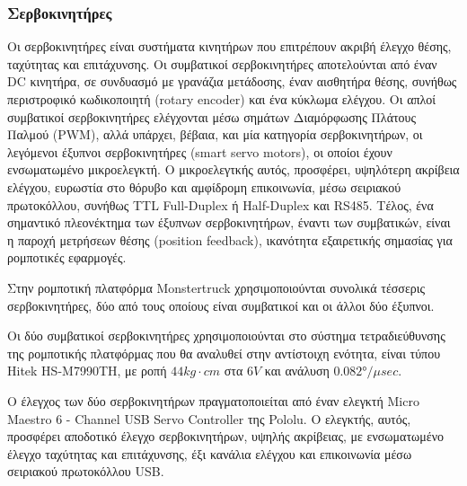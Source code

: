 \bigskip
\subsubsection{Σερβοκινητήρες} \label{sssec:servos}
Οι σερβοκινητήρες είναι συστήματα κινητήρων που επιτρέπουν ακριβή έλεγχο θέσης, ταχύτητας και επιτάχυνσης. Οι {συμβατικοί σερβοκινητήρες} αποτελούνται από έναν DC κινητήρα, σε συνδυασμό με {γρανάζια μετάδοσης}, έναν {αισθητήρα θέσης}, συνήθως {περιστροφικό κωδικοποιητή (rotary encoder)} και ένα κύκλωμα ελέγχου. Οι απλοί συμβατικοί σερβοκινητήρες ελέγχονται μέσω σημάτων Διαμόρφωσης Πλάτους Παλμού (PWM), αλλά υπάρχει, βέβαια, και μία κατηγορία σερβοκινητήρων, οι λεγόμενοι {έξυπνοι σερβοκινητήρες (smart servo motors)}, οι οποίοι έχουν ενσωματωμένο μικροελεγκτή. Ο μικροελεγτκής αυτός, προσφέρει, υψηλότερη ακρίβεια ελέγχου, ευρωστία στο θόρυβο και αμφίδρομη επικοινωνία, μέσω σειριακού πρωτοκόλλου, συνήθως {TTL Full-Duplex} ή {Half-Duplex} και {RS485}. Τέλος, ένα σημαντικό πλεονέκτημα των έξυπνων σερβοκινητήρων, έναντι των συμβατικών, είναι η παροχή μετρήσεων θέσης (position feedback), ικανότητα εξαιρετικής σημασίας για ρομποτικές εφαρμογές.

\bigskip
Στην ρομποτική πλατφόρμα {Monstertruck} χρησιμοποιούνται συνολικά τέσσερις σερβοκινητήρες, δύο από τους οποίους είναι {συμβατικοί} και οι άλλοι δύο {έξυπνοι}.

\bigskip
Οι δύο {συμβατικοί σερβοκινητήρες} χρησιμοποιούνται στο σύστημα {τετραδιεύθυνσης} της ρομποτικής πλατφόρμας που θα αναλυθεί στην αντίστοιχη ενότητα, είναι τύπου {Hitek HS-M7990TH}, με ροπή $44 kg \cdot cm $ στα $6V$ και ανάλυση $0.082°/\mu sec$.

\bigskip
Ο έλεγχος των δύο σερβοκινητήρων πραγματοποιείται από έναν ελεγκτή {Micro Maestro 6 - Channel USB Servo Controller} της {Pololu}. Ο ελεγκτής, αυτός, προσφέρει αποδοτικό έλεγχο σερβοκινητήρων, υψηλής ακρίβειας, με ενσωματωμένο έλεγχο ταχύτητας και επιτάχυνσης, έξι κανάλια ελέγχου και επικοινωνία μέσω σειριακού πρωτοκόλλου {USB}.

